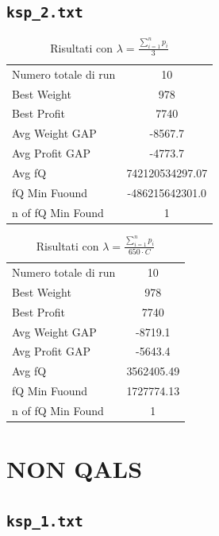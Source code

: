 \documentclass[a4paper,12pt]{article}
\begin{document}
\subsection{\texttt{ksp\_2.txt}}

\begin{table}[H]
\centering
\begin{tabular}{lc}
\toprule
Numero totale di run & 10 \\
Best Weight & 978 \\
Best Profit & 7740 \\
Avg Weight GAP & -8567.7 \\
Avg Profit GAP & -4773.7 \\
Avg fQ & 742120534297.07 \\
fQ Min Fuound & -486215642301.0 \\
n of fQ Min Found & 1 \\
\bottomrule
\end{tabular}
\caption{Risultati con $\lambda = \displaystyle \frac{\sum_{i=1}^{n} p_i}{3}$}
\end{table}

\begin{table}[H]
\centering
\begin{tabular}{lc}
\toprule
Numero totale di run & 10 \\
Best Weight & 978 \\
Best Profit & 7740 \\
Avg Weight GAP & -8719.1 \\
Avg Profit GAP & -5643.4 \\
Avg fQ & 3562405.49 \\
fQ Min Fuound & 1727774.13 \\
n of fQ Min Found & 1 \\
\bottomrule
\end{tabular}
\caption{Risultati con $\lambda = \displaystyle \frac{\sum_{i=1}^{n} p_i}{650 \cdot C}$}
\end{table}

\section{NON QALS}

\subsection{\texttt{ksp\_1.txt}}
\end{document}
